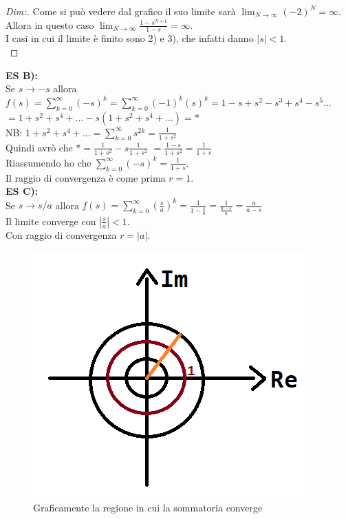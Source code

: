 \begin{proof}[Dim:]
	\pagebreak
	
	Come si può vedere dal grafico il suo limite sarà $ \lim_{N \to \infty} (-2)^N = \infty $.\\
	Allora in questo caso $ \lim_{N \to \infty} \frac{ 1-s^{N+1} }{ 1-s } = \infty $.\\
	
	I casi in cui il limite è finito sono 2) e 3), che infatti danno $ |s| < 1$.\\
	
\end{proof}

\textbf{ES B):}\\
Se $ s \longrightarrow -s$ allora $ f(s) = \sum_{k=0}^\infty (-s)^{k} = \sum_{k=0}^\infty (-1)^{k} (s)^k = 1 -s + s^2 - s^3 + s^4 - s^5...$\\
$ = 1 + s^2 + s^4+ ... - s (1 + s^2 + s^4 + ...) = *$\\
NB: $ 1 + s^2 + s^4+ ... = \sum_{k=0}^\infty s^{2k} = \frac{1}{1+s^2}  $\\
Quindi avrò che $* = \frac{1}{1+s^2} - s \frac{1}{1+s^2}$
$ = \frac{1-s}{1+s^2} = \frac{1}{1+s}$\\
Riassumendo ho che $  \sum_{k=0}^\infty (-s)^{k} = \frac{1}{1+s}$.\\
Il raggio di convergenza è come prima $r=1$.\\

\textbf{ES C):}\\
Se $ s \longrightarrow s/a$ allora $ f(s) = \sum_{k=0}^\infty (\frac{s}{a})^k = \frac{1}{1-\frac{s}{a}} = \frac{1}{\frac{a-s}{a}} = \frac{a}{a-s}$\\
Il limite converge con $ |\frac{s}{a}| <1 $.\\
Con raggio di convergenza $ r = |a|$.

\begin{figure}[h]
	\centering
	\includegraphics[scale=0.75]{immagini/raggioDiConv2}
	\caption{ Graficamente la regione in cui la sommatoria converge }
	\label{fig: raggioDiConvergenza}
\end{figure}

